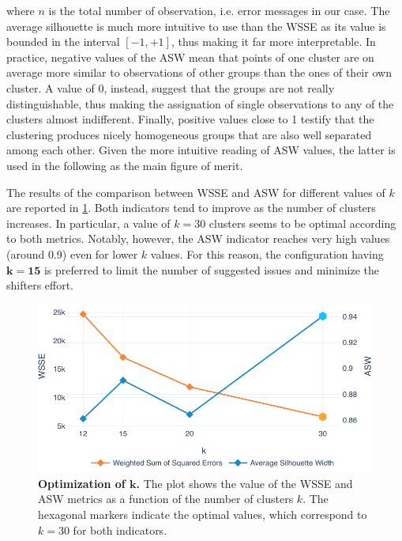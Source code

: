 where $n$ is the total number of observation, i.e. error messages in our case.
The average silhouette is much more intuitive to use than the WSSE as its value is bounded in the interval $\left[ -1, +1 \right]$, thus making it far more interpretable.
In practice, negative values of the ASW mean that points of one cluster are on average more similar to observations of other groups than the ones of their own cluster. A value of 0, instead, suggest that the groups are not really distinguishable, thus making the assignation of single observations to any of the clusters almost indifferent.
Finally, positive values close to 1 testify that the clustering produces nicely homogeneous groups that are also well separated among each other.
Given the more intuitive reading of ASW values, the latter is used in the following as the main figure of merit.


The results of the comparison between WSSE and ASW for different values of $k$ are reported in \cref{fig:k_optim}.
Both indicators tend to improve as the number of clusters increases.
In particular, a value of $k=30$ clusters seems to be optimal according to both metrics.
Notably, however, the ASW indicator reaches very high values (around 0.9) even for lower $k$ values.
For this reason, the configuration having $\boldsymbol{k=15}$ is preferred to limit the number of suggested issues and minimize the shifters effort.

\begin{figure}
    \centering
    \includegraphics[width=\textwidth]{figures/410_method/kmeans/k_optim.pdf}
    \caption{\textbf{Optimization of $\boldsymbol{k}$.} The plot shows the value of the WSSE and ASW metrics as a function of the number of clusters $k$. The hexagonal markers indicate the optimal values, which correspond to $k=30$ for both indicators.}
    \label{fig:k_optim}
\end{figure}
